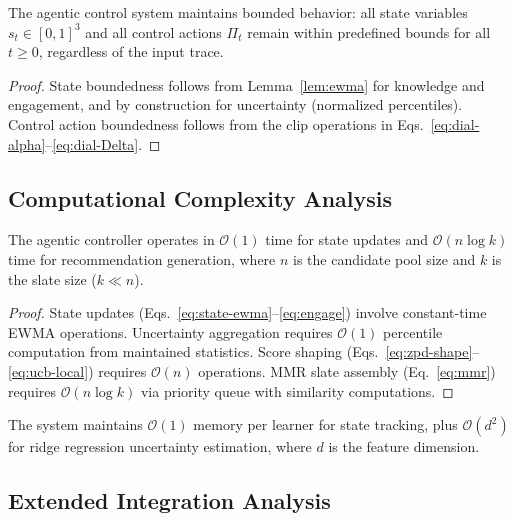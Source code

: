 \begin{theorem}
\label{thm:stability}
The agentic control system maintains bounded behavior: all state variables $s_t \in [0,1]^3$ and all control actions $\Pi_t$ remain within predefined bounds for all $t \geq 0$, regardless of the input trace.
\end{theorem}

\begin{proof}
State boundedness follows from Lemma~\ref{lem:ewma} for knowledge and engagement, and by construction for uncertainty (normalized percentiles). Control action boundedness follows from the clip operations in Eqs.~\eqref{eq:dial-alpha}--\eqref{eq:dial-Delta}.
\end{proof}

\subsection{Computational Complexity Analysis}

\begin{proposition}
\label{prop:complexity}
The agentic controller operates in $\mathcal{O}(1)$ time for state updates and $\mathcal{O}(n \log k)$ time for recommendation generation, where $n$ is the candidate pool size and $k$ is the slate size ($k \ll n$).
\end{proposition}

\begin{proof}
State updates (Eqs.~\ref{eq:state-ewma}--\ref{eq:engage}) involve constant-time EWMA operations. Uncertainty aggregation requires $\mathcal{O}(1)$ percentile computation from maintained statistics. Score shaping (Eqs.~\ref{eq:zpd-shape}--\ref{eq:ucb-local}) requires $\mathcal{O}(n)$ operations. MMR slate assembly (Eq.~\ref{eq:mmr}) requires $\mathcal{O}(n \log k)$ via priority queue with similarity computations.
\end{proof}

\begin{proposition}
\label{prop:space-complexity}
The system maintains $\mathcal{O}(1)$ memory per learner for state tracking, plus $\mathcal{O}(d^2)$ for ridge regression uncertainty estimation, where $d$ is the feature dimension.
\end{proposition}

\subsection{Extended Integration Analysis}

